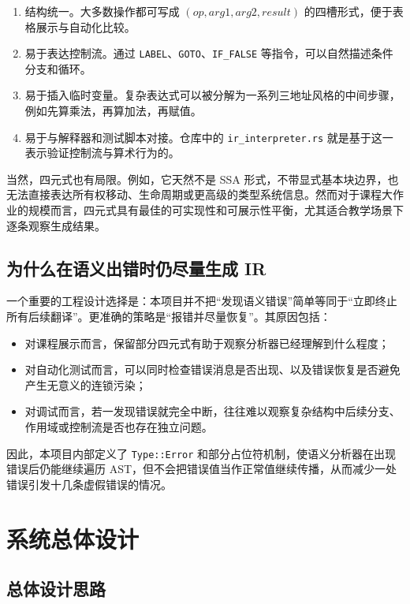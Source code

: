 \documentclass[UTF8,a4paper,12pt]{ctexart}
\newcommand{\pkg}[1]{\texttt{#1}}
\newcommand{\op}[1]{\texttt{#1}}
\begin{document}
\begin{enumerate}[label=\arabic*.]
    \item 结构统一。大多数操作都可写成 \((op, arg1, arg2, result)\) 的四槽形式，便于表格展示与自动化比较。
    \item 易于表达控制流。通过 \op{LABEL}、\op{GOTO}、\op{IF\_FALSE} 等指令，可以自然描述条件分支和循环。
    \item 易于插入临时变量。复杂表达式可以被分解为一系列三地址风格的中间步骤，例如先算乘法，再算加法，再赋值。
    \item 易于与解释器和测试脚本对接。仓库中的 \pkg{ir\_interpreter.rs} 就是基于这一表示验证控制流与算术行为的。
\end{enumerate}

当然，四元式也有局限。例如，它天然不是 SSA 形式，不带显式基本块边界，也无法直接表达所有权移动、生命周期或更高级的类型系统信息。然而对于课程大作业的规模而言，四元式具有最佳的可实现性和可展示性平衡，尤其适合教学场景下逐条观察生成结果。

\subsection{为什么在语义出错时仍尽量生成 IR}

一个重要的工程设计选择是：本项目并不把“发现语义错误”简单等同于“立即终止所有后续翻译”。更准确的策略是“报错并尽量恢复”。其原因包括：

\begin{itemize}
    \item 对课程展示而言，保留部分四元式有助于观察分析器已经理解到什么程度；
    \item 对自动化测试而言，可以同时检查错误消息是否出现、以及错误恢复是否避免产生无意义的连锁污染；
    \item 对调试而言，若一发现错误就完全中断，往往难以观察复杂结构中后续分支、作用域或控制流是否也存在独立问题。
\end{itemize}

因此，本项目内部定义了 \pkg{Type::Error} 和部分占位符机制，使语义分析器在出现错误后仍能继续遍历 AST，但不会把错误值当作正常值继续传播，从而减少一处错误引发十几条虚假错误的情况。

\section{系统总体设计}

\subsection{总体设计思路}
\end{document}
